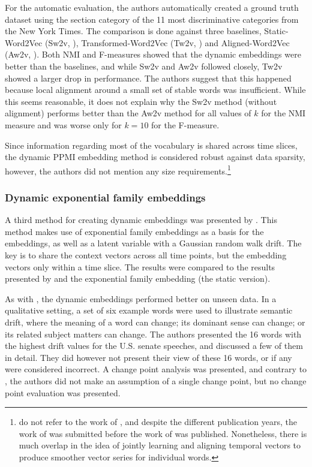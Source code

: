 \documentclass[output=paper]{langsci/langscibook}
\begin{document}
For the automatic evaluation, the authors automatically created a ground truth dataset using the section category of the 11 most discriminative categories from the New York Times. 
The comparison is done against three baselines,  Static-Word2Vec (Sw2v, \citealt{mikolov2013-distributed}), Transformed-Word2Vec (Tw2v, \citealt{kulkarni2015statistically}) and Aligned-Word2Vec (Aw2v, \citealt{hamilton-etal-2016-diachronic}). Both NMI and F-measures showed that the dynamic embeddings were better than the baselines, and while Sw2v and Aw2v followed closely, Tw2v showed a larger drop in performance. The authors suggest that this happened because local alignment around a small set of stable words was insufficient. While this seems reasonable, it does not explain why the Sw2v method (without alignment) performs better than the Aw2v method for all values of $k$ for the NMI measure and was worse only for $k=10$ for the F-measure. 

\begin{sloppypar}
Since information regarding most of the vocabulary is shared across time slices, the dynamic PPMI embedding method is considered robust against data sparsity, however, the authors did not mention any size requirements.\footnote{\citet{yao2018dynamic} do not refer to the work of \citet{bamler17}, and despite the different publication years, the work of \citet{yao2018dynamic} was submitted  before the work of \citet{bamler17} was published. Nonetheless, there is much overlap in the idea of jointly learning and aligning temporal vectors to produce smoother vector series for individual words.}
\end{sloppypar}

\subsubsection{Dynamic exponential family embeddings}
A third method for creating dynamic embeddings was presented by \citet{rudolphb18-dynamicembforlangevo}. This method makes use of exponential family embeddings as a basis for the embeddings, as well as a latent variable with a Gaussian random walk drift.
The key is to share the context vectors across all time points, but the embedding vectors only within a time slice. The results were compared to the results presented by \citet{hamilton-etal-2016-diachronic} and the exponential family embedding (the static version).  

As with \citet{bamler17}, the dynamic embeddings performed better on unseen data.
In a qualitative setting, a set of six example words were used to illustrate semantic drift, where the meaning of a word can change; its dominant sense can change; or its related subject matters can change.
The authors presented the 16 words with the highest drift values for the U.S. senate speeches, and discussed a few of them in detail. They did however  not present their view of these 16 words, or if any were considered incorrect. 
A change point analysis was presented, and contrary to \citet{kulkarni2015statistically}, the authors did not make an assumption of a single change point, but no change point evaluation was presented. 
\end{document}
